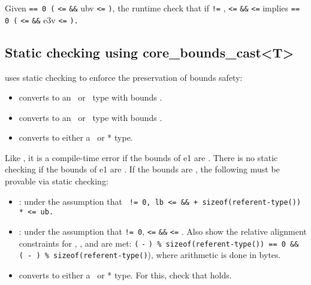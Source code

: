 Given  \texttt{== 0 \textbar{}\textbar{} (}
\texttt{<=}  \texttt{\&\&} ubv \texttt{<=}
\texttt{)}, the runtime check that if  \texttt{!=}
,  \texttt{<=}  \texttt{\&\&}
 \texttt{<=}  implies 
\texttt{== 0 \textbar{}\textbar{} (} \texttt{<=}
 \texttt{\&\&} e3v \texttt{<=}
\texttt{).}

\subsection{Static checking using core\_bounds\_cast\textless{}T\textgreater{}}

uses static checking to enforce the preservation of bounds safety:

\begin{itemize}
\item
   converts  to an \arrayptr\ or
  \arrayview\ type with bounds
  .
\item
   converts  to an
  \arrayptr\ or \arrayview\ type with bounds
  .
\item
  converts  to either a \ptr\ or * type.
\end{itemize}

Like , it
is a compile-time error if the bounds of e1 are \boundsnone.
There is no static checking if the bounds of e1 are
\boundsany. If the bounds are , 
the following must be provable via static checking:

\begin{itemize}
\item
  : under the assumption that 
  \texttt{ != 0, lb <=  \&\& 
          + sizeof(referent-type()) *  <= ub.}
\item
  : 
  under the assumption that
   \texttt{!= 0},  \texttt{<=} 
  \texttt{\&\&}  \texttt{<=} . Also show the
  relative alignment constraints for , , and 
  are met: \texttt{(} \texttt{-} \texttt{) \%
  sizeof(referent-type(}\texttt{)) == 0 \&\& ( - )
  \%
  sizeof(referent-type(}\texttt{)}), where arithmetic is done in
  bytes.
\item
  converts  to either a \ptr\ or * type. For this, check
  that
   holds.
\end{itemize}

